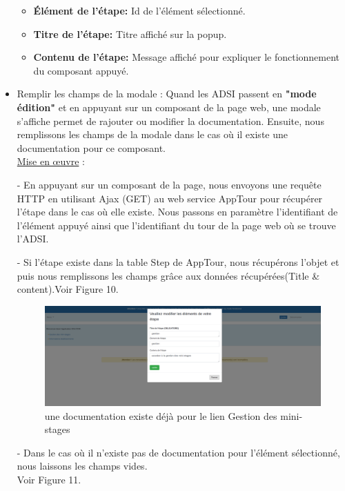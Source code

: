 \documentclass[12pt]{article}
\begin{document}
\begin{itemize}
\begin{itemize}
\item \textbf{Élément de l'étape: } Id de l'élément sélectionné. 
\item \textbf{Titre de l'étape: } Titre affiché sur la popup. 
\item \textbf{Contenu de l'étape: } Message affiché pour expliquer le fonctionnement du composant appuyé.  
\end{itemize}


\item  Remplir les champs de la modale : Quand les ADSI passent en \textbf{"mode édition"} et en appuyant sur un composant de la page web, une modale s'affiche permet de rajouter ou modifier la documentation. Ensuite, nous remplissons les champs de la modale dans le cas où il existe une documentation pour ce composant. \\

\underline{Mise en œuvre} : 

- En appuyant sur un composant de la page, nous envoyons une requête HTTP en utilisant Ajax (GET) au web service AppTour pour récupérer l'étape dans le cas où elle existe. Nous passons en paramètre l'identifiant de l'élément appuyé ainsi que l'identifiant du tour de la page web où se trouve l'ADSI. 

- Si l'étape existe dans la table Step de AppTour, nous récupérons l'objet et puis nous remplissons les champs grâce aux données récupérées(Title \& content).Voir Figure 10.

\begin{figure}[H]
	\centering
 		\includegraphics[width=1\textwidth]{diagrammes/Modal_gestion.png} 
  		\caption{une documentation existe déjà pour le lien Gestion des mini-stages}
	\end{figure}

- Dans le cas où il n’existe pas de documentation pour l'élément sélectionné, nous laissons les champs vides.\\ Voir Figure 11.


\end{itemize}
\end{document}
